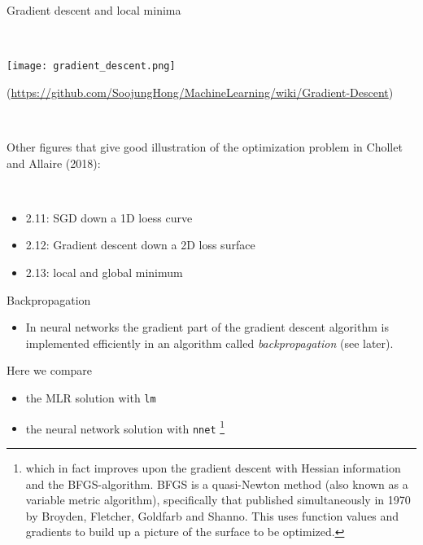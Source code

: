 \documentclass[10pt,ignorenonframetext,]{beamer}
\providecommand{\tightlist}{%
  \setlength{\itemsep}{0pt}\setlength{\parskip}{0pt}}
\begin{document}
\begin{frame}

\begin{block}{Gradient descent and local minima}

\(~\)

\center

\texttt{[image: gradient\_descent.png]}

\tiny (\url{https://github.com/SoojungHong/MachineLearning/wiki/Gradient-Descent})

\(~\) \(~\)

\flushleft
\normalsize

Other figures that give good illustration of the optimization problem in
Chollet and Allaire (2018):

\(~\)

\begin{itemize}
\tightlist
\item
  2.11: SGD down a 1D loess curve
\item
  2.12: Gradient descent down a 2D loss surface
\item
  2.13: local and global minimum
\end{itemize}

\end{block}

\end{frame}

\begin{frame}[fragile]

\begin{block}{Backpropagation}

\vspace{2mm}

\begin{itemize}
\tightlist
\item
  In neural networks the gradient part of the gradient descent algorithm
  is implemented efficiently in an algorithm called
  \emph{backpropagation} (see later).
\end{itemize}

\vspace{4mm}

Here we compare

\begin{itemize}
\tightlist
\item
  the MLR solution with \texttt{lm}
\item
  the neural network solution with \texttt{nnet}
  \footnote{which in fact improves upon the gradient descent with Hessian information and the BFGS-algorithm. BFGS is a quasi-Newton method (also known as a variable metric algorithm), specifically that published simultaneously in 1970 by Broyden, Fletcher, Goldfarb and Shanno. This uses function values and gradients to build up a picture of the surface to be optimized.}
\end{itemize}

\end{block}

\end{frame}
\end{document}
